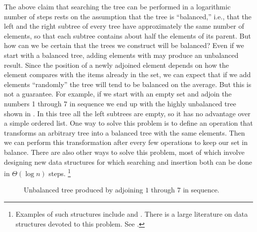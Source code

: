 The above claim that searching the tree can be performed in a logarithmic number of steps rests on the assumption that the tree is “balanced,” i.e., that the left and the right subtree of every tree have approximately the same number of elements, so that each subtree contains about half the elements of its parent.
But how can we be certain that the trees we construct will be balanced?
Even if we start with a balanced tree, adding elements with  may produce an unbalanced result.
Since the position of a newly adjoined element depends on how the element compares with the items already in the set, we can expect that if we add elements “randomly” the tree will tend to be balanced on the average.
But this is not a guarantee.
For example, if we start with an empty set and adjoin the numbers 1 through 7 in sequence we end up with the highly unbalanced tree shown in .
In this tree all the left subtrees are empty, so it has no advantage over a simple ordered list.
One way to solve this problem is to define an operation that transforms an arbitrary tree into a balanced tree with the same elements.
Then we can perform this transformation after every few  operations to keep our set in balance.
There are also other ways to solve this problem, most of which involve designing new data structures for which searching and insertion both can be done in \( Θ(\log n) \) steps.%
\footnote{
	Examples of such structures include  and .
	There is a large literature on data structures devoted to this problem.
	See .
}

\begin{figure}[tb]
	\centering
	
	\caption{
		Unbalanced tree produced by adjoining \( 1 \) through \( 7 \) in sequence.
	}
	\label{Figure 2.17}
\end{figure}



